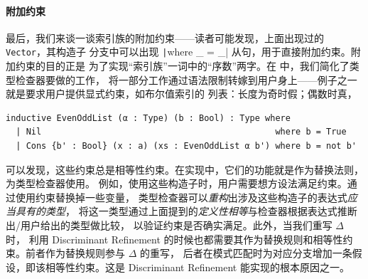 \paragraph{附加约束}
最后，我们来谈一谈索引族的附加约束——读者可能发现，上面出现过的 \texttt{Vector}，其构造子
分支中可以出现 \texttt|where _ = _| 从句，用于直接附加约束。附加约束的目的正是
为了实现“索引族”一词中的“序数”两字。在 \Tigrisd 中，我们简化了类型检查器要做的工作，
将一部分工作通过语法限制转嫁到用户身上——例子之一就是要求用户提供显式约束，如布尔值索引的
列表：长度为奇时假；偶数时真，
\begin{verbatim}
inductive EvenOddList (α : Type) (b : Bool) : Type where
  | Nil                                              where b = True
  | Cons {b' : Bool} (x : a) (xs : EvenOddList α b') where b = not b'
\end{verbatim}
\vspace{-.8em}
可以发现，这些约束总是相等性约束。在实现中，它们的功能就是作为替换法则，为类型检查器使用。
例如，使用这些构造子时，用户需要想方设法满足约束。通过使用约束替换掉一些变量，
类型检查器可以\emph{重构}出涉及这些构造子的表达式\emph{应当具有的类型}，
将这一类型通过上面提到的\emph{定义性相等}与检查器根据表达式推断出/用户给出的类型做比较，
以验证约束是否确实满足。此外，当我们重写 $\Delta$ 时，
利用 Discriminant Refinement 的时候也都需要其作为替换规则和相等性约束。前者作为替换规则参与 $\Delta$ 的重写，
后者在模式匹配时为对应分支增加一条假设，即该相等性约束。这是 Discriminant Refinement 能实现的根本原因之一。
